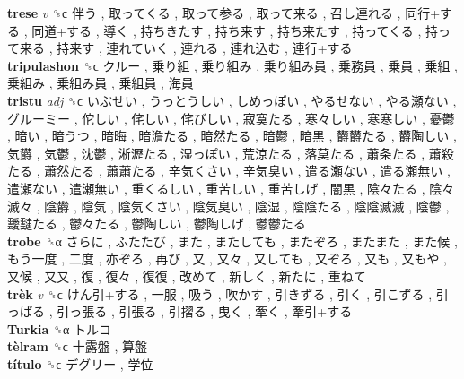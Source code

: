 \textbf{trese} \emph{v}  ␝ϲ   伴う ,  取ってくる ,  取って参る ,  取って来る ,  召し連れる ,  同行+する ,  同道+する ,  導く ,  持ちきたす ,  持ち来す ,  持ち来たす ,  持ってくる ,  持って来る ,  持来す ,  連れていく ,  連れる ,  連れ込む ,  連行+する   \\
\textbf{tripulashon} ␝ϲ   クルー ,  乗り組 ,  乗り組み ,  乗り組み員 ,  乗務員 ,  乗員 ,  乗組 ,  乗組み ,  乗組み員 ,  乗組員 ,  海員   \\
\textbf{tristu} \emph{adj}  ␝ϲ   いぶせい ,  うっとうしい ,  しめっぽい ,  やるせない ,  やる瀬ない ,  グルーミー ,  佗しい ,  侘しい ,  侘びしい ,  寂寞たる ,  寒々しい ,  寒寒しい ,  憂鬱 ,  暗い ,  暗うつ ,  暗晦 ,  暗澹たる ,  暗然たる ,  暗鬱 ,  暗黒 ,  欝欝たる ,  欝陶しい ,  気欝 ,  気鬱 ,  沈鬱 ,  淅瀝たる ,  湿っぽい ,  荒涼たる ,  落莫たる ,  蕭条たる ,  蕭殺たる ,  蕭然たる ,  蕭蕭たる ,  辛気くさい ,  辛気臭い ,  遣る瀬ない ,  遣る瀬無い ,  遣瀬ない ,  遣瀬無い ,  重くるしい ,  重苦しい ,  重苦しげ ,  闇黒 ,  陰々たる ,  陰々滅々 ,  陰欝 ,  陰気 ,  陰気くさい ,  陰気臭い ,  陰湿 ,  陰陰たる ,  陰陰滅滅 ,  陰鬱 ,  靉靆たる ,  鬱々たる ,  鬱陶しい ,  鬱陶しげ ,  鬱鬱たる   \\
\textbf{trobe} ␝α   さらに ,  ふたたび ,  また ,  またしても ,  またぞろ ,  またまた ,  また候 ,  もう一度 ,  二度 ,  亦ぞろ ,  再び ,  又 ,  又々 ,  又しても ,  又ぞろ ,  又も ,  又もや ,  又候 ,  又又 ,  復 ,  復々 ,  復復 ,  改めて ,  新しく ,  新たに ,  重ねて   \\
\textbf{trèk} \emph{v}  ␝ϲ   けん引+する ,  一服 ,  吸う ,  吹かす ,  引きずる ,  引く ,  引こずる ,  引っぱる ,  引っ張る ,  引張る ,  引摺る ,  曳く ,  牽く ,  牽引+する   \\
\textbf{Turkia} ␝α   トルコ   \\
\textbf{tèlram} ␝ϲ   十露盤 ,  算盤   \\
\textbf{título} ␝ϲ   デグリー ,  学位   \\
